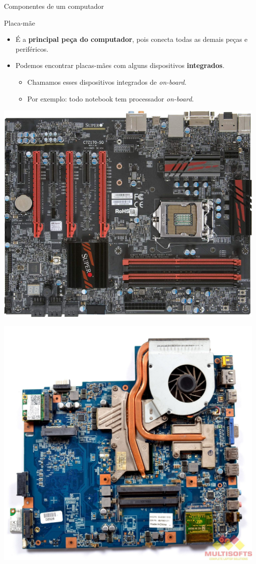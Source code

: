\begin{frame}{Componentes de um computador}
	\begin{block}{Placa-mãe}
		\begin{itemize}
			\item É a \textbf{principal peça do computador}, pois conecta todas as demais peças e periféricos.
			\item Podemos encontrar placas-mães com alguns dispositivos \textbf{integrados}.
			      \begin{itemize}
				      \item\normalsize Chamamos esses dispositivos integrados de \textit{on-board}.
				      \item\normalsize Por exemplo: todo notebook tem processador \textit{on-board}.
			      \end{itemize}
		\end{itemize}
	\end{block}

	\begin{minipage}{0.49\linewidth}
		\centering
		\includegraphics[width=0.8\linewidth]{Figuras/Ch01/fig32}
	\end{minipage}\hfill
	\begin{minipage}{0.49\linewidth}
		\centering
		\includegraphics[width=0.8\linewidth]{Figuras/Ch01/fig30}
	\end{minipage}
\end{frame}


